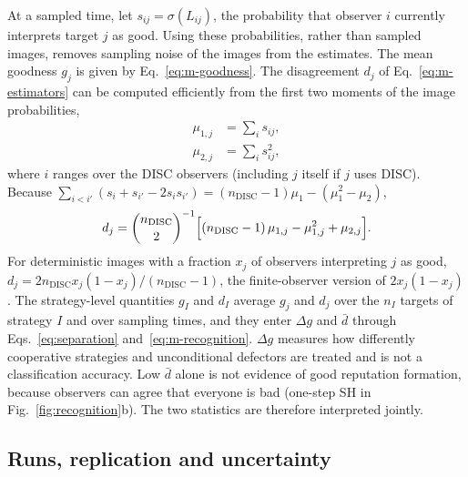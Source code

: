 \documentclass[10pt]{wlscirep}
\newcommand{\DISC}{\mathrm{DISC}}
\theoremstyle{plain}
\theoremstyle{remark}
\begin{document}
At a sampled time, let $s_{ij}=\sigma(L_{ij})$, the probability that observer $i$ currently interprets target $j$ as good. Using these probabilities, rather than sampled images, removes sampling noise of the images from the estimates. The mean goodness $g_j$ is given by Eq.~\eqref{eq:m-goodness}. The disagreement $d_j$ of Eq.~\eqref{eq:m-estimators} can be computed efficiently from the first two moments of the image probabilities,
\begin{equation}
\begin{aligned}
\mu_{1,j}&=\sum_is_{ij},\\
\mu_{2,j}&=\sum_is_{ij}^2,
\end{aligned}
\label{eq:s-moments}
\end{equation}
where $i$ ranges over the DISC observers (including $j$ itself if $j$ uses DISC). Because $\sum_{i<i'}(s_i+s_{i'}-2s_is_{i'})=(n_{\DISC}-1)\mu_1-(\mu_1^2-\mu_2)$,
\begin{equation}
d_j=\binom{n_{\DISC}}{2}^{-1}\Bigl[(n_{\DISC}-1)\,\mu_{1,j}-\mu_{1,j}^2+\mu_{2,j}\Bigr].
\label{eq:s-estimators}
\end{equation}
For deterministic images with a fraction $x_j$ of observers interpreting $j$ as good, $d_j=2n_{\DISC}x_j(1-x_j)/(n_{\DISC}-1)$, the finite-observer version of $2x_j(1-x_j)$. The strategy-level quantities $g_I$ and $d_I$ average $g_j$ and $d_j$ over the $n_I$ targets of strategy $I$ and over sampling times, and they enter $\Delta g$ and $\bar d$ through Eqs.~\eqref{eq:separation} and~\eqref{eq:m-recognition}. $\Delta g$ measures how differently cooperative strategies and unconditional defectors are treated and is not a classification accuracy. Low $\bar d$ alone is not evidence of good reputation formation, because observers can agree that everyone is bad (one-step SH in Fig.~\ref{fig:recognition}b). The two statistics are therefore interpreted jointly.

\subsection{Runs, replication and uncertainty}
\end{document}
